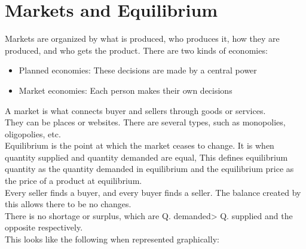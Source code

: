 \documentclass[nobib]{tufte-handout}
\begin{document}
\section{Markets and Equilibrium}
Markets are organized by what is produced, who produces it, how they are
produced, and who gets the product. There are two kinds of economies:
\begin{itemize}
    \item Planned economies: These decisions are made by a central power
    \item Market economies: Each person makes their own decisions
\end{itemize}
A market is what connects buyer and sellers through goods or services.\\
They can be places or websites. There are several types, such as monopolies, oligopolies, etc.\\
Equilibrium is the point at which the market ceases to change. It is when quantity supplied and quantity demanded are equal,
This defines equilibrium quantity as the quantity demanded in equilibrium and the equilibrium price as the price of a product at equilibrium.\\
Every seller finds a buyer, and every buyer finds a seller. The balance created by this allows there to be no changes.\\
There is no shortage or surplus, which are Q. demanded> Q. supplied and the opposite respectively.\\
This looks like the following when represented graphically:
\begin{center}
\end{center}
\end{document}
